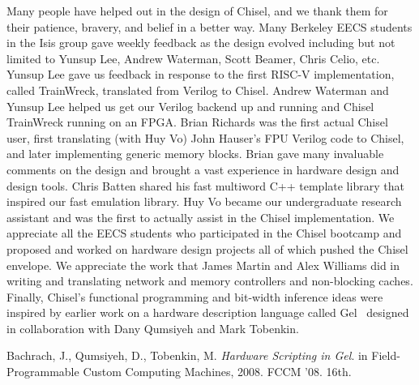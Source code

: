 \documentclass[10pt,twocolumn]{article}
\def\note#1{\noindent{\bf [Note: #1]}}
\begin{document}
Many people have helped out in the design of Chisel, and we thank them
for their patience, bravery, and belief in a better way.  Many
Berkeley EECS students in the Isis group gave weekly feedback as the
design evolved including but not limited to Yunsup Lee, Andrew
Waterman, Scott Beamer, Chris Celio, etc.  Yunsup Lee gave us feedback
in response to the first RISC-V implementation, called TrainWreck,
translated from Verilog to Chisel.  Andrew Waterman and Yunsup Lee
helped us get our Verilog backend up and running and Chisel TrainWreck
running on an FPGA.  Brian Richards was the first actual Chisel user,
first translating (with Huy Vo) John Hauser's FPU Verilog code to
Chisel, and later implementing generic memory blocks.  Brian gave many
invaluable comments on the design and brought a vast experience in
hardware design and design tools.  Chris Batten shared his fast
multiword C++ template library that inspired our fast emulation
library.  Huy Vo became our undergraduate research assistant and was
the first to actually assist in the Chisel implementation.  We
appreciate all the EECS students who participated in the Chisel
bootcamp and proposed and worked on hardware design projects all of
which pushed the Chisel envelope.  We appreciate the work that James
Martin and Alex Williams did in writing and translating network and
memory controllers and non-blocking caches.  Finally, Chisel's
functional programming and bit-width inference ideas were inspired by
earlier work on a hardware description language called Gel~\cite{gel} designed in
collaboration with Dany Qumsiyeh and Mark Tobenkin.


\begin{thebibliography}{50}
 Bachrach, J., Qumsiyeh, D., Tobenkin, M. \textsl{Hardware Scripting in Gel}.
in Field-Programmable Custom Computing Machines, 2008. FCCM '08. 16th.
\end{thebibliography}
\end{document}
